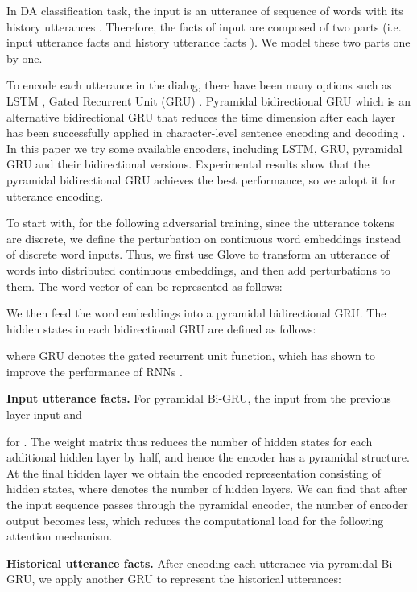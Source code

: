 \documentclass[conference]{IEEEtran}
\begin{document}
	In DA classification task, the input is an utterance of sequence of  words  with its history utterances . Therefore, the facts of input are composed of two parts (i.e. input utterance facts  and history utterance facts ). We model these two parts one by one. 
	
	To encode each utterance in the dialog, there have been many options such as LSTM \cite{kumar2017dialogue}, Gated Recurrent Unit (GRU) \cite{chung2014empirical, xiong2016dynamic}. 
	Pyramidal bidirectional GRU which is an alternative bidirectional GRU that reduces the time dimension after each layer has been successfully applied in character-level sentence encoding and decoding \cite{chan2016listen}. In this paper we try some available encoders, including LSTM, GRU, pyramidal GRU and their bidirectional versions. Experimental results show that the pyramidal bidirectional GRU achieves the best performance, so we adopt it for utterance encoding.
	
	To start with, for the following adversarial training, since the utterance tokens are discrete, we define the perturbation on continuous word embeddings instead of discrete word inputs. Thus, we first use Glove \cite{pennington2014glove} to transform an utterance of  words  into distributed continuous embeddings, and then add perturbations to them. The word vector of  can be represented as follows:
	
	
	We then feed the word embeddings into a pyramidal bidirectional GRU. The hidden states in each bidirectional GRU are defined as follows:
	
	
	where GRU denotes the gated recurrent unit function, which has shown to improve the performance of RNNs \cite{cho2014learning,hochreiter1997long}.
	
	\noindent\textbf{Input utterance facts. }For pyramidal Bi-GRU, the input from the previous layer input  and
	
	for . The weight matrix  thus reduces the number of hidden states for each additional hidden layer by half, and hence the encoder has a pyramidal structure. At the final hidden layer we obtain the encoded representation  consisting of  hidden states, where  denotes the number of hidden layers. We can find that after the input sequence passes through the pyramidal encoder, the number of encoder output becomes less, which reduces the computational load for the following attention mechanism. 
	
	\noindent\textbf{Historical utterance facts. }After encoding each utterance via pyramidal  Bi-GRU, we apply another GRU to represent the historical utterances:
	
\end{document}
